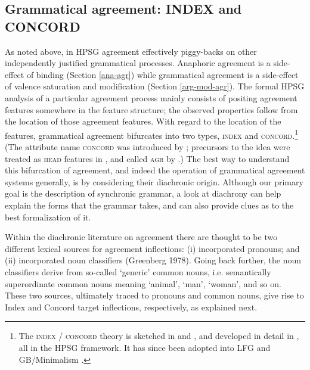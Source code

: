 \documentclass[output=paper]{langsci/langscibook}
\begin{document}
\subsection{Grammatical agreement: INDEX and CONCORD}
\label{ind-con}
As noted above, in  HPSG agreement effectively piggy-backs on other independently justified grammatical processes.  Anaphoric agreement is a side-effect of binding (Section \ref{ana-agr}) while  grammatical agreement is a side-effect of valence saturation and modification (Section \ref{arg-mod-agr}).  The formal HPSG analysis of a particular agreement process mainly consists of positing agreement features somewhere in the feature structure; the observed properties follow from the location of those agreement features.  With regard to the location of the features, grammatical agreement bifurcates into two types, \textsc{index} and \textsc{concord}.\footnote{The \textsc{index} / \textsc{concord} theory is sketched in  \citet[ch.\ 2]{Pollard+Sag:1994} and \citet{kathol:1999}, and developed in detail in  \citet{Wechsler+Zlatic:2000,Wechsler+Zlatic:2003}, all in the HPSG framework.  It has since been adopted into LFG \citep[inter alia]{king+dalrymple:2004} and GB/Minimalism \citep{Danon:2009}.}  (The attribute name  \textsc{concord} was introduced by \citet{Wechsler+Zlatic:2000,Wechsler+Zlatic:2003}; precursors to the idea were treated as \textsc{head} features in \citet{Pollard+Sag:1994}, and called \textsc{agr} by \citet{kathol:1999}.)   The best way to understand this bifurcation of agreement, and indeed the operation of grammatical agreement systems generally, is by considering their diachronic origin.   Although our primary goal is the description of synchronic grammar, a look at diachrony can help explain the forms that the grammar takes, and can also provide clues as to the best formalization of it.  

Within the diachronic literature on agreement there are thought to be two different lexical sources for agreement inflections: (i) incorporated pronouns; and (ii) incorporated noun classifiers (Greenberg 1978).  Going back further, the noun classifiers derive from so-called ‘generic’ common nouns, i.e. semantically superordinate common nouns meaning ‘animal’, ‘man’, ‘woman’, and so on.  These two sources, ultimately traced to pronouns and common nouns, give rise to Index and Concord target inflections, respectively, as explained next.    
\end{document}
